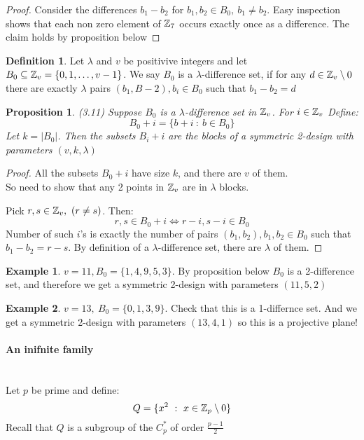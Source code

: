 \documentclass[]{article}
\newtheorem{prop}[thm]{Proposition}
\theoremstyle{definition}
\newtheorem*{defn}{Definition}
\newtheorem*{exmp}{Example}
\theoremstyle{remark}
\numberwithin{equation}{section}
\begin{document}
			\begin{proof}
				Consider the differences $b_1 - b_2$ for $b_1, b_2 \in B_0,\ b_1 \neq b_2$. Easy inspection shows that each non zero element of $\mathbb{Z}_7$ occurs exactly once as a difference. The claim holds by proposition below
			\end{proof}

			\begin{defn}
				Let $\lambda$ and $v$ be positivive integers and let $B_0 \subseteq \mathbb{Z}_v = \{0, 1, \hdots, v-1\}$. We say $B_0$ is a $\lambda$-difference set, if for any $d\in \mathbb{Z}_v \setminus 0$ there are exactly $\lambda$ pairs $(b_1, B-2), b_i \in B_0$ such that $b_1 - b_2 = d$
			\end{defn}

			\begin{prop}(3.11)
				Suppose $B_0$ is a $\lambda$-difference set in $\mathbb{Z}_v$. For $i \in \mathbb{Z}_v$ Define:
				\[
					B_0 + i = \{b+i \ :\ b \in B_0\}
				\]	
				Let $k = |B_0|$. Then the subsets $B_i + i$ are the blocks of a symmetric 2-design with parameters $(v, k, \lambda)$
			\end{prop}

			\begin{proof}
				All the subsets $B_0 + i$ have size $k$, and there are $v$ of them.\\
				So need to show that any 2 points in $\mathbb{Z}_v$ are in $\lambda$ blocks.

				Pick $r, s \in \mathbb{Z}_v,\ (r\neq s)$. Then:
				\[
					r,s \in B_0 + i \iff r-i, s-i \in B_0
				\]
				Number of such $i$'s is exactly the number of pairs $(b_1, b_2), b_1, b_2 \in B_0$ such that $b_1 - b_2 = r- s$. By definition of a $\lambda$-difference set, there are $\lambda$ of them.
			\end{proof}


			\begin{exmp}
				$v = 11, B_0 = \{1,4,9,5,3\}$. By proposition below $B_0$ is a 2-difference set, and therefore we get a symmetric 2-design with parameters $(11,5,2)$
			\end{exmp}

			\begin{exmp} 
				$v= 13,\ B_0 = \{0,1,3,9\}$. Check that this is a 1-differnce set. And we get a symmetric 2-design with parameters $(13,4,1)$ so this is a projective plane!
			\end{exmp}

			\paragraph*{An inifnite family}\hfill\\
				Let $p$ be prime and define:
				\[
					Q = \{x^2\ :\ x\in \mathbb{Z}_p \setminus 0\}
				\]					
				Recall that $Q$ is a subgroup of the $C_p^*$ of order $\frac{p-1}{2}$\\
\end{document}
